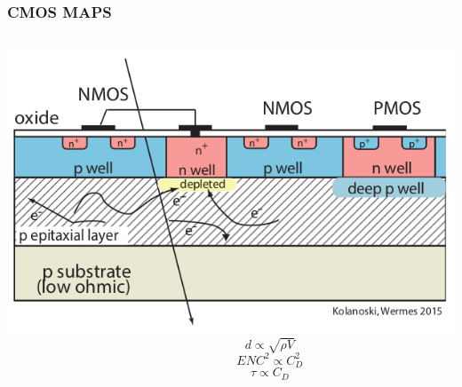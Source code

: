     \begin{frame}
        \frametitle{CMOS MAPS}
        \begin{columns}
                \centering
                \includegraphics[width=.99\linewidth]{figures/Pixel_detectors/MAPS_scheme.png}
                \bigskip
                \begin{equation*}
                    \hspace{75pt} d \propto \sqrt{\rho V}
                \end{equation*}   
                \begin{equation*}
                    \hspace{75pt} ENC^2 \propto C_D ^2
                \end{equation*}  
                \begin{equation*}
                    \hspace{75pt} \tau \propto C_D

\end{equation*}
\end{columns}
\end{frame}
